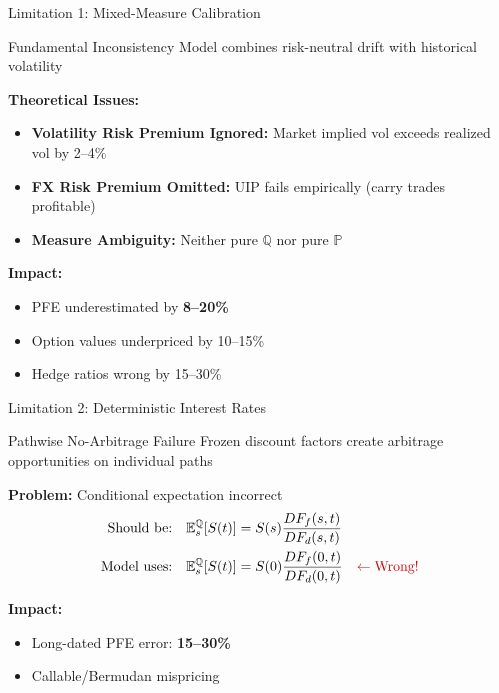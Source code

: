 \documentclass[11pt,aspectratio=169]{beamer}
\begin{document}
	\begin{frame}{Limitation 1: Mixed-Measure Calibration}
		\begin{alertblock}{Fundamental Inconsistency}
			Model combines risk-neutral drift with historical volatility
		\end{alertblock}
		
		\vspace{0.2cm}
		
		\textbf{Theoretical Issues:}
		\begin{itemize}
			\item \textbf{Volatility Risk Premium Ignored:} Market implied vol exceeds realized vol by 2--4\%
			\item \textbf{FX Risk Premium Omitted:} UIP fails empirically (carry trades profitable)
			\item \textbf{Measure Ambiguity:} Neither pure $\mathbb{Q}$ nor pure $\mathbb{P}$
		\end{itemize}
		
		\vspace{0.2cm}
		
		\textbf{Impact:}
		\begin{itemize}
			\item[$\times$] PFE  underestimated by \textcolor{mufgred}{\textbf{8--20\%}}
			\item[$\times$] Option values underpriced by 10--15\%
			\item[$\times$] Hedge ratios wrong by 15--30\%
		\end{itemize}
	\end{frame}
	
		\begin{frame}{Limitation 2: Deterministic Interest Rates}
		\begin{block}{Pathwise No-Arbitrage Failure}
			Frozen discount factors create arbitrage opportunities on individual paths
		\end{block}
		
		\vspace{0.2cm}
		
		\textbf{Problem:} Conditional expectation incorrect
		\begin{align*}
			\text{Should be:} \quad & \mathbb{E}_s^{\mathbb{Q}}[S(t)] = S(s) \frac{DF_f(s,t)}{DF_d(s,t)} \\
			\text{Model uses:} \quad & \mathbb{E}_s^{\mathbb{Q}}[S(t)] = S(0) \frac{DF_f(0,t)}{DF_d(0,t)} \quad \textcolor{mufgred}{\leftarrow \text{Wrong!}}
		\end{align*}
		
		\vspace{0.2cm}
		
		\textbf{Impact:}
		\begin{itemize}

			\item Long-dated PFE error: \textbf{15--30\%}

			\item Callable/Bermudan mispricing
		\end{itemize}
	\end{frame}
	
\end{document}
